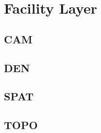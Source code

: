 \chapter{Facility Layer\label{chap:facilitylayer}}
\section{CAM\label{sec:cam}}

\section{DEN\label{sec:den}}

\section{SPAT\label{sec:spat}}

\section{TOPO\label{sec:topo}}
